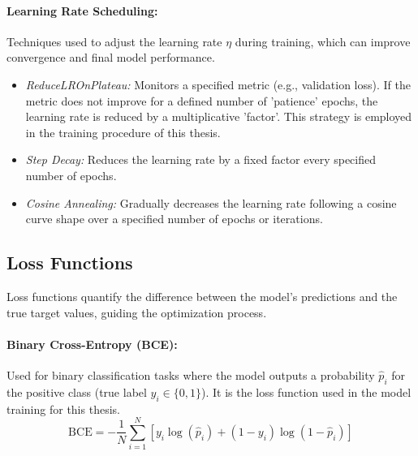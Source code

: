 \begin{appendices}
  \paragraph{Learning Rate Scheduling:}
  Techniques used to adjust the learning rate \( \eta \) during training, which can improve convergence and final model performance.
  \begin{itemize}
    \item \textit{ReduceLROnPlateau:} Monitors a specified metric (e.g., validation loss). If the metric does not improve for a defined number of 'patience' epochs, the learning rate is reduced by a multiplicative 'factor'. This strategy is employed in the training procedure of this thesis.
    \item \textit{Step Decay:} Reduces the learning rate by a fixed factor every specified number of epochs.
    \item \textit{Cosine Annealing:} Gradually decreases the learning rate following a cosine curve shape over a specified number of epochs or iterations.
  \end{itemize}

  \subsection{Loss Functions}
  Loss functions quantify the difference between the model's predictions and the true target values, guiding the optimization process.

  \paragraph{Binary Cross-Entropy (BCE):}
  \label{eq:bce} %
  Used for binary classification tasks where the model outputs a probability \( \hat{p}_i \) for the positive class (true label \( y_i \in \{0, 1\} \)). It is the loss function used in the model training for this thesis.
  \begin{equation}
    \text{BCE} = -\frac{1}{N} \sum_{i=1}^N [ y_i \log(\hat{p}_i) + (1 - y_i) \log(1 - \hat{p}_i) ]
  \end{equation}



\end{appendices}
